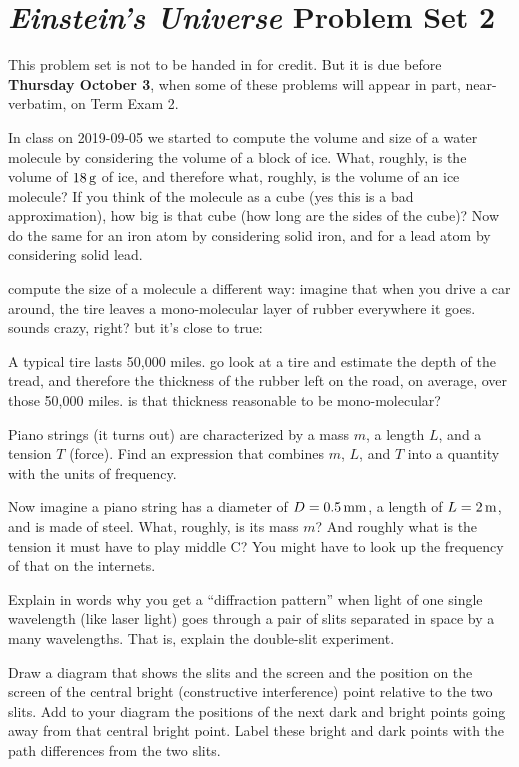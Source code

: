 \documentclass[12pt, letterpaper]{article}
\begin{document}
\section*{\textsl{Einstein's Universe} Problem Set 2}

This problem set is not to be handed in for credit. But it is due
before \textbf{Thursday October 3}, when some of these problems
will appear in part, near-verbatim, on Term Exam 2.

\begin{problem}
In class on 2019-09-05 we started to compute the volume and size of a
water molecule by considering the volume of a block of ice. What,
roughly, is the volume of $18\,\mathrm{g}$ of ice, and therefore what,
roughly, is the volume of an ice molecule? If you think of the
molecule as a cube (yes this is a bad approximation), how big is that
cube (how long are the sides of the cube)? Now do the same for an iron
atom by considering solid iron, and for a lead atom by considering
solid lead.
\end{problem}

\begin{problem}
compute the size of a molecule a different way: imagine that when you
drive a car around, the tire leaves a mono-molecular layer of rubber
everywhere it goes. sounds crazy, right? but it's close to true:

A typical tire lasts 50,000 miles. go look at a tire and estimate the
depth of the tread, and therefore the thickness of the rubber left on
the road, on average, over those 50,000 miles. is that thickness
reasonable to be mono-molecular?
\end{problem}

\begin{problem}
Piano strings (it turns out) are characterized by a mass $m$, a length
$L$, and a tension $T$ (force). Find an expression that combines $m$,
$L$, and $T$ into a quantity with the units of frequency.

Now imagine a piano string has a diameter of $D=0.5\,\mathrm{mm}$, a length of
$L=2\,\mathrm{m}$, and is made of steel. What, roughly, is its mass $m$? And
roughly what is the tension it must have to play middle C? You might
have to look up the frequency of that on the internets.
\end{problem}

\begin{problem}
Explain in words why you get a ``diffraction pattern'' when light of
one single wavelength (like laser light) goes through a pair of slits
separated in space by a many wavelengths. That is, explain the
double-slit experiment.

Draw a diagram that shows the slits and the screen and the position on
the screen of the central bright (constructive interference) point
relative to the two slits. Add to your diagram the positions of the
next dark and bright points going away from that central bright
point. Label these bright and dark points with the path differences
from the two slits.
\end{problem}
\end{document}
